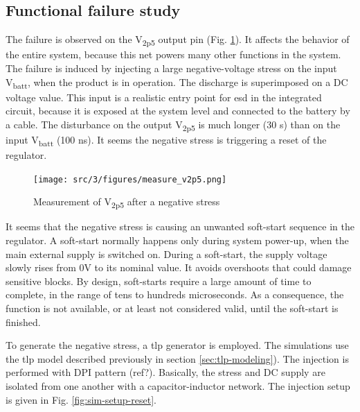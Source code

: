 \subsection{Functional failure study}
\label{sec:failure-case-study}


The failure is observed on the V\textsubscript{2p5} output pin (Fig. \ref{fig:meas-reset-v2p5}).
It affects the behavior of the entire system, because this net powers many other functions in the system.
The failure is induced by injecting a large negative-voltage stress on the input V\textsubscript{batt}, when the product is in operation.
The discharge is superimposed on a DC voltage value.
This input is a realistic entry point for \gls{esd} in the integrated circuit, because it is exposed at the system level and connected to the battery by a cable.
The disturbance on the output V\textsubscript{2p5} is much longer (30 \textmu{}s) than on the input V\textsubscript{batt} (100 ns).
It seems the negative stress is triggering a reset of the regulator.

\begin{figure}[!htbp]
  \centering
  \texttt{[image: src/3/figures/measure\_v2p5.png]}
  \caption{Measurement of V\textsubscript{2p5} after a negative stress}
  \label{fig:meas-reset-v2p5}
\end{figure}

It seems that the negative stress is causing an unwanted \gls{soft-start} sequence in the regulator.
A soft-start normally happens only during system power-up, when the main external supply is switched on.
During a soft-start, the supply voltage slowly rises from 0V to its nominal value.
It avoids overshoots that could damage sensitive blocks.
By design, soft-starts require a large amount of time to complete, in the range of tens to hundreds microseconds.
As a consequence, the function is not available, or at least not considered valid, until the soft-start is finished.

To generate the negative stress, a \gls{tlp} generator is employed.
The simulations use the \gls{tlp} model described previously in section \ref{sec:tlp-modeling}).
The injection is performed with DPI pattern (ref?).
Basically, the stress and DC supply are isolated from one another with a capacitor-inductor network.
The injection setup is given in Fig. \ref{fig:sim-setup-reset}.

